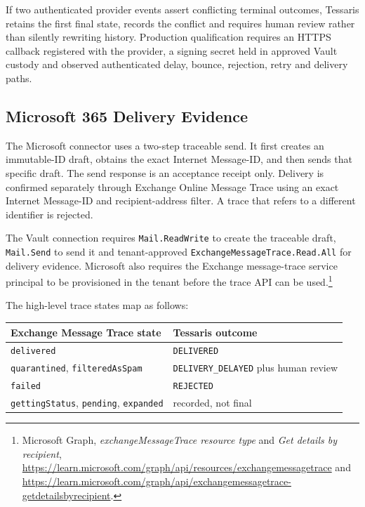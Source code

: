 If two authenticated provider events assert conflicting terminal outcomes,
Tessaris retains the first final state, records the conflict and requires human
review rather than silently rewriting history.  Production qualification
requires an HTTPS callback registered with the provider, a signing secret held
in approved Vault custody and observed authenticated delay, bounce, rejection,
retry and delivery paths.

\subsection{Microsoft 365 Delivery Evidence}

The Microsoft connector uses a two-step traceable send.  It first creates an
immutable-ID draft, obtains the exact Internet Message-ID, and then sends that
specific draft.  The send response is an acceptance receipt only.  Delivery is
confirmed separately through Exchange Online Message Trace using an exact
Internet Message-ID and recipient-address filter.  A trace that refers to a
different identifier is rejected.

The Vault connection requires \texttt{Mail.ReadWrite} to create the traceable
draft, \texttt{Mail.Send} to send it and tenant-approved
\texttt{ExchangeMessageTrace.Read.All} for delivery evidence.  Microsoft also
requires the Exchange message-trace service principal to be provisioned in the
tenant before the trace API can be used.\footnote{Microsoft Graph,
\emph{exchangeMessageTrace resource type} and \emph{Get details by recipient},
\url{https://learn.microsoft.com/graph/api/resources/exchangemessagetrace} and
\url{https://learn.microsoft.com/graph/api/exchangemessagetrace-getdetailsbyrecipient}.}

The high-level trace states map as follows:

\begin{center}
\begin{tabular}{@{}ll@{}}
\toprule
\textbf{Exchange Message Trace state} & \textbf{Tessaris outcome} \\
\midrule
\texttt{delivered} & \texttt{DELIVERED} \\
\texttt{quarantined}, \texttt{filteredAsSpam} &
\texttt{DELIVERY\_DELAYED} plus human review \\
\texttt{failed} & \texttt{REJECTED} \\
\texttt{gettingStatus}, \texttt{pending}, \texttt{expanded} & recorded, not final \\
\bottomrule
\end{tabular}
\end{center}

